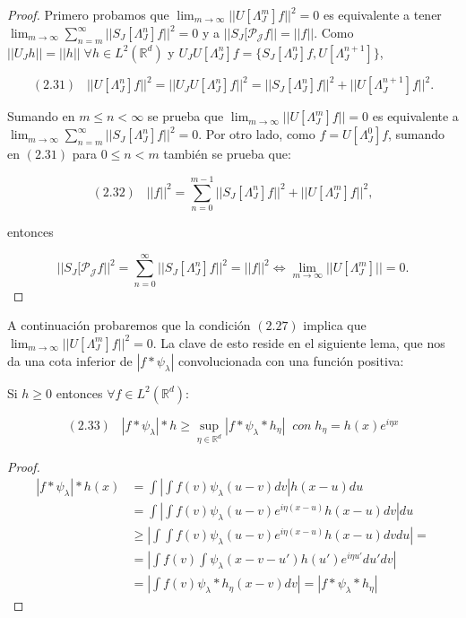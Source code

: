 \begin{proof}
\noindent Primero probamos que $\lim_{m\rightarrow \infty} ||U[\Lambda_J^m]f||^2=0$ es equivalente a tener $\lim_{m\rightarrow\infty} \sum_{n=m}^{\infty} ||S_J[\Lambda_J^n]f||^2=0$ y a $||S_J[\mathcal{P_J}f||=||f||$. Como $||U_J h||=||h|| \; \forall h \in L^2(\mathbb{R}^d)$ y $U_J U[\Lambda_J^n]f=\lbrace S_J[\Lambda_J^n]f,U[\Lambda_J^{n+1}]\rbrace$,

$$(2.31) \;\;\; ||U[\Lambda_J^n]f||^2=||U_JU[\Lambda_J^n]f||^2=||S_J[\Lambda_J^n]f||^2+||U[\Lambda_J^{n+1}]f||^2.$$

\noindent Sumando en $m\leq n < \infty$ se prueba que $\lim_{m\rightarrow \infty} ||U[\Lambda_J^m]f||=0$ es equivalente a $\lim_{m\rightarrow\infty} \sum_{n=m}^{\infty} ||S_J[\Lambda_J^n]f||^2=0$. Por otro lado, como $f=U[\Lambda_J^0]f$, sumando en $(2.31)$ para $0\leq n < m$ también se prueba que:

$$(2.32) \;\;\; ||f||^2=\sum_{n=0}^{m-1} ||S_J[\Lambda_J^n]f||^2 + ||U[\Lambda_J^m]f||^2,$$

entonces

$$||S_J[\mathcal{P_J}f||^2=\sum_{n=0}^\infty ||S_J[\Lambda_J^n]f||^2=||f||^2 \iff \lim_{m\rightarrow\infty}||U[\Lambda_J^m]||=0.$$ \qedhere

\end{proof}

\noindent A continuación probaremos que la condición $(2.27)$ implica que $\lim_{m\rightarrow\infty}||U[\Lambda_J^m]f||^2=0$. La clave de esto reside en el siguiente lema, que nos da una cota inferior de $|f\ast\psi_\lambda|$ convolucionada con una función positiva: 

\begin{lema}
Si $h\geq 0$ entonces $\forall f \in L^2(\mathbb{R}^d)$: 

$$(2.33) \;\;\; |f \ast \psi_\lambda | \ast h \geq \sup_{\eta \in \mathbb{R}^d} |f\ast \psi_\lambda \ast h_\eta | \; \; con \; h_\eta=h(x)e^{i\eta x}$$
\end{lema}

\begin{proof}

\begin{align*}
    |f \ast \psi_\lambda | \ast h (x) &= \int \left| \int f(v)\psi_\lambda(u-v)dv \right| h(x-u)du \\
    &=\int \left | \int f(v) \psi_\lambda(u-v) e^{i\eta(x-u)} h(x-u) dv \right| du \\
    &\geq \left | \int \int f(v) \psi_\lambda(u-v) e^{i\eta(x-u)} h(x-u) dv du \right| = \\
    &= \left | \int f(v) \int  \psi_\lambda(x-v-u')h(u') e^{i\eta u'}  du' dv \right| \\
    &= \left | \int f(v) \psi_\lambda \ast h_\eta(x-v) dv \right| = |f\ast \psi_\lambda \ast h_\eta|
\end{align*}
\end{proof}

